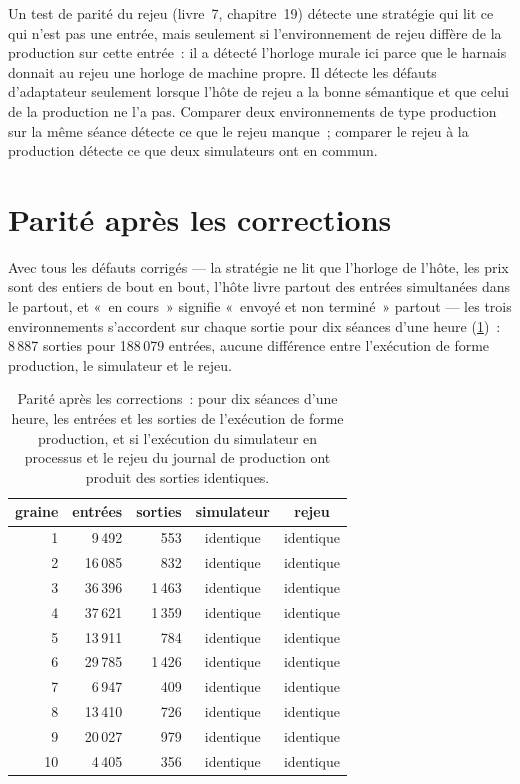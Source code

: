 \begin{remark}\label{rem:pl:simulation-production-parity:replay}
Un test de parité du rejeu (livre~7, chapitre~19) détecte une stratégie qui lit ce qui n'est pas une entrée, mais seulement si l'environnement de rejeu diffère de
la production sur cette entrée~: il a détecté l'horloge murale ici parce que le harnais donnait au rejeu une horloge de machine propre. Il détecte les défauts d'adaptateur
seulement lorsque l'hôte de rejeu a la bonne sémantique et que celui de la production ne l'a pas. Comparer deux environnements de type production sur la même
séance détecte ce que le rejeu manque~; comparer le rejeu à la production détecte ce que deux simulateurs ont en commun.
\end{remark}

\section{Parité après les corrections}

Avec tous les défauts corrigés --- la stratégie ne lit que l'horloge de l'hôte, les prix sont des entiers de bout en bout, l'hôte livre partout des entrées simultanées
dans le  partout, et «~en cours~» signifie «~envoyé et non terminé~» partout --- les trois environnements s'accordent sur chaque sortie pour dix
séances d'une heure (\cref{tab:pl:simulation-production-parity:clean})~: 8\,887 sorties pour 188\,079 entrées, aucune différence entre l'exécution de forme
production, le simulateur et le rejeu.

\begin{table}[ht]
\centering\small
\begin{tabular}{rrrcc}
\toprule
graine & entrées & sorties & simulateur & rejeu \\
\midrule
1 & 9\,492 & 553 & identique & identique \\
2 & 16\,085 & 832 & identique & identique \\
3 & 36\,396 & 1\,463 & identique & identique \\
4 & 37\,621 & 1\,359 & identique & identique \\
5 & 13\,911 & 784 & identique & identique \\
6 & 29\,785 & 1\,426 & identique & identique \\
7 & 6\,947 & 409 & identique & identique \\
8 & 13\,410 & 726 & identique & identique \\
9 & 20\,027 & 979 & identique & identique \\
10 & 4\,405 & 356 & identique & identique \\
\bottomrule
\end{tabular}
\caption{Parité après les corrections~: pour dix séances d'une heure, les entrées et les sorties de l'exécution de forme production, et si l'exécution du simulateur en processus
et le rejeu du journal de production ont produit des sorties identiques.}\label{tab:pl:simulation-production-parity:clean}
\end{table}

